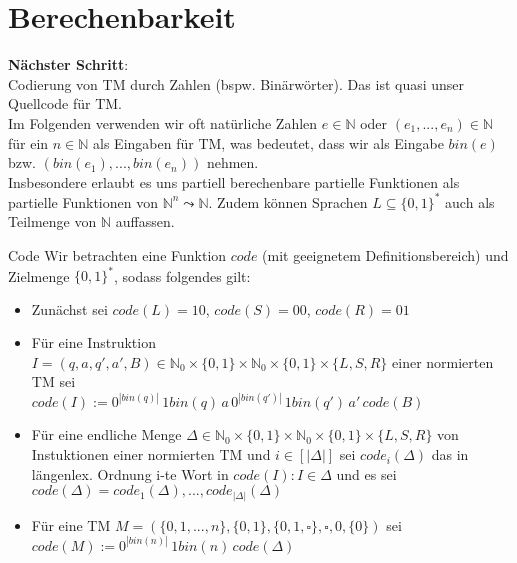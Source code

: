 
\section{Berechenbarkeit}

\textbf{Nächster Schritt}: \\
Codierung von TM durch Zahlen (bspw. Binärwörter). Das ist quasi unser Quellcode für TM. \\
Im Folgenden verwenden wir oft natürliche Zahlen $e \in \mathbb{N}$ oder $(e_1,...,e_n) \in \mathbb{N}$ 
für ein $n \in \mathbb{N}$ als Eingaben für TM, was bedeutet, dass wir als Eingabe $bin(e)$ 
bzw. $(bin(e_1),...,bin(e_n))$ nehmen. \\

Insbesondere erlaubt es uns partiell berechenbare partielle Funktionen als partielle Funktionen von $\mathbb{N}^n \leadsto \mathbb{N}$.
Zudem können Sprachen $L \subseteq \{0,1\}^*$ auch als Teilmenge von $\mathbb{N}$ auffassen.

\begin{defn}{Code}
    Wir betrachten eine Funktion $code$ (mit geeignetem Definitionsbereich) und Zielmenge $\{0,1\}^*$, sodass folgendes gilt:
    \begin{itemize}
        \item Zunächst sei $code(L)=10$, $code(S)=00$, $code(R)=01$
        \item Für eine Instruktion $I = (q,a,q',a',B) \in \mathbb{N}_0 \times \{0,1\} \times \mathbb{N}_0 \times \{0,1\} \times \{L,S,R\}$
              einer normierten TM sei \\
              $code(I) := 0^{| bin(q) |} \, 1bin(q) \, a \, 0^{| bin(q')|} \, 1bin(q') \, a' \, code(B)$
        \item Für eine endliche Menge $\Delta \in \mathbb{N}_0 \times \{0,1\} \times \mathbb{N}_0 \times \{0,1\} \times \{L,S,R\}$ von Instuktionen einer
              normierten TM und $i \in [| \Delta |]$ sei $code_i(\Delta)$ das in längenlex. Ordnung i-te Wort in 
              $code(I) : I \in \Delta$ und es sei $code(\Delta) = code_1(\Delta),...,code_{| \Delta |}(\Delta)$
        \item Für eine TM $M= (\{0,1,...,n\},\{0,1\},\{0,1,\square\},\square,0,\{0\})$ sei \\
              $code(M) := 0^{| bin(n) |} \, 1bin(n) \, code(\Delta)$ 
    \end{itemize}
\end{defn}

